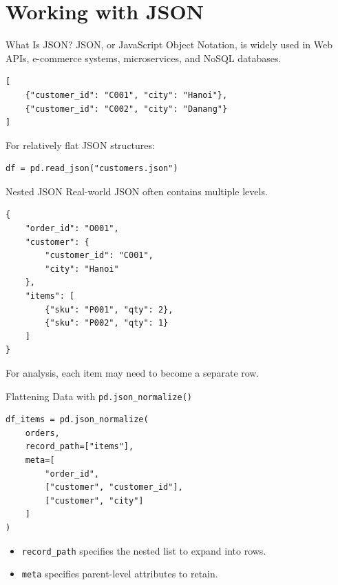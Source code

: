 \documentclass[aspectratio=169,11pt]{beamer}
\newcommand{\code}[1]{\texttt{#1}}
\begin{document}
\section{Working with JSON}

\begin{frame}[fragile]{What Is JSON?}
JSON, or JavaScript Object Notation, is widely used in Web APIs, e-commerce systems, microservices, and NoSQL databases.

\begin{lstlisting}[style=textstyle]
[
    {"customer_id": "C001", "city": "Hanoi"},
    {"customer_id": "C002", "city": "Danang"}
]
\end{lstlisting}

For relatively flat JSON structures:
\begin{lstlisting}[style=pythonstyle]
df = pd.read_json("customers.json")
\end{lstlisting}
\end{frame}

\begin{frame}[fragile]{Nested JSON}
Real-world JSON often contains multiple levels.

\begin{lstlisting}[style=pythonstyle]
{
    "order_id": "O001",
    "customer": {
        "customer_id": "C001",
        "city": "Hanoi"
    },
    "items": [
        {"sku": "P001", "qty": 2},
        {"sku": "P002", "qty": 1}
    ]
}
\end{lstlisting}

For analysis, each item may need to become a separate row.
\end{frame}

\begin{frame}[fragile]{Flattening Data with \code{pd.json\_normalize()}}
\begin{lstlisting}[style=pythonstyle]
df_items = pd.json_normalize(
    orders,
    record_path=["items"],
    meta=[
        "order_id",
        ["customer", "customer_id"],
        ["customer", "city"]
    ]
)
\end{lstlisting}

\begin{itemize}
  \item \code{record\_path} specifies the nested list to expand into rows.
  \item \code{meta} specifies parent-level attributes to retain.
\end{itemize}
\end{frame}
\end{document}
